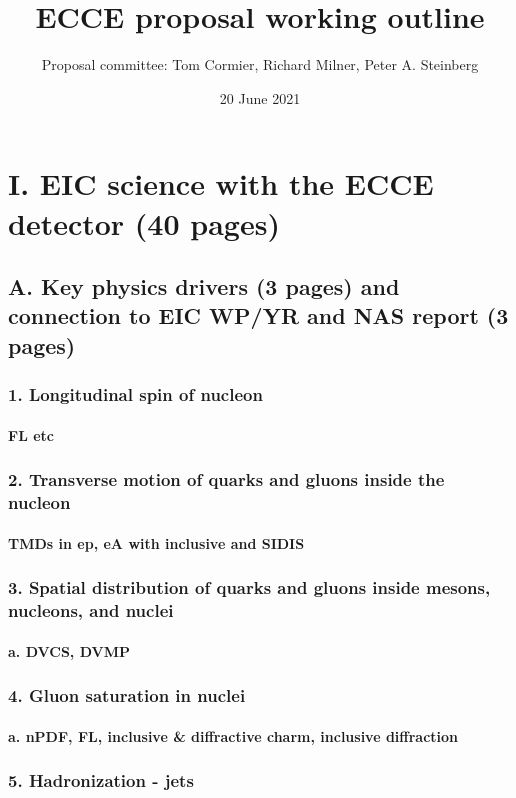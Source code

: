 \documentclass{report}
\title{\bf ECCE proposal working outline}
\author{Proposal committee: Tom Cormier, Richard Milner, Peter A. Steinberg}
\date{20 June 2021}
\begin{document}
\maketitle
\setcounter{tocdepth}{5}
\tableofcontents
%
\chapter{I. EIC science with the ECCE detector (40 pages)}
%
\section{A. Key physics drivers (3 pages) and connection to EIC WP/YR and NAS report (3 pages)}
\subsection{1. Longitudinal spin of nucleon}
\subsubsection{FL etc}
\subsection{2. Transverse motion of quarks and gluons inside the nucleon}
\subsubsection{TMDs in ep, eA with inclusive and SIDIS}
\subsection{3. Spatial distribution of quarks and gluons inside mesons, nucleons, and nuclei}
\subsubsection{a. DVCS, DVMP}
\subsection{4. Gluon saturation in nuclei}
\subsubsection{a. nPDF, FL, inclusive \& diffractive charm, inclusive diffraction}
\subsection{5. Hadronization - jets}
%
\newpage
\end{document}
